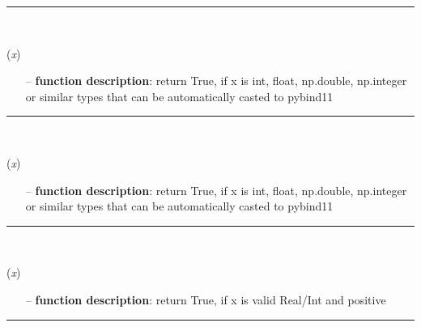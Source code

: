 \begin{itemize}[leftmargin=1.4cm]
\begin{itemize}[leftmargin=0.7cm]
\vspace{12pt}\end{itemize}
%
\noindent\rule{8cm}{0.75pt}\vspace{1pt} \\ 
\begin{flushleft}
\label{sec:advancedUtilities:IsValidBool}
({\it x})
\end{flushleft}
\setlength{\itemindent}{0.7cm}
\begin{itemize}[leftmargin=0.7cm]
\item[--]
{\bf function description}: return True, if x is int, float, np.double, np.integer or similar types that can be automatically casted to pybind11
\vspace{12pt}\end{itemize}
%
\noindent\rule{8cm}{0.75pt}\vspace{1pt} \\ 
\begin{flushleft}
\label{sec:advancedUtilities:IsValidRealInt}
({\it x})
\end{flushleft}
\setlength{\itemindent}{0.7cm}
\begin{itemize}[leftmargin=0.7cm]
\item[--]
{\bf function description}: return True, if x is int, float, np.double, np.integer or similar types that can be automatically casted to pybind11
\vspace{12pt}\end{itemize}
%
\noindent\rule{8cm}{0.75pt}\vspace{1pt} \\ 
\begin{flushleft}
\label{sec:advancedUtilities:IsValidPRealInt}
({\it x})
\end{flushleft}
\setlength{\itemindent}{0.7cm}
\begin{itemize}[leftmargin=0.7cm]
\item[--]
{\bf function description}: return True, if x is valid Real/Int and positive
\vspace{12pt}\end{itemize}
%
\noindent\rule{8cm}{0.75pt}\vspace{1pt} \\ 

\end{itemize}
